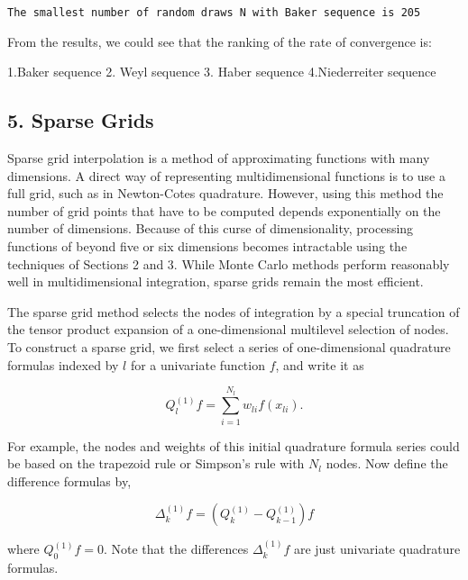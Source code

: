 \documentclass[11pt]{article}
\begin{document}
    \begin{Verbatim}[commandchars=\\\{\}]
The smallest number of random draws N with Baker sequence is 205

    \end{Verbatim}

    From the results, we could see that the ranking of the rate of
convergence is:

1.Baker sequence 2. Weyl sequence 3. Haber sequence 4.Niederreiter
sequence

    \subsection{5. Sparse Grids}\label{sparse-grids}

Sparse grid interpolation is a method of approximating functions with
many dimensions. A direct way of representing multidimensional functions
is to use a full grid, such as in Newton-Cotes quadrature. However,
using this method the number of grid points that have to be computed
depends exponentially on the number of dimensions. Because of this curse
of dimensionality, processing functions of beyond five or six dimensions
becomes intractable using the techniques of Sections 2 and 3. While
Monte Carlo methods perform reasonably well in multidimensional
integration, sparse grids remain the most efficient.

The sparse grid method selects the nodes of integration by a special
truncation of the tensor product expansion of a one-dimensional
multilevel selection of nodes. To construct a sparse grid, we first
select a series of one-dimensional quadrature formulas indexed by \(l\)
for a univariate function \(f\), and write it as

\begin{equation}\label{EqSGQuad}
  Q_l^{(1)}f = \sum_{i=1}^{N_l}w_{li}f(x_{li}).
\end{equation}

For example, the nodes and weights of this initial quadrature formula
series could be based on the trapezoid rule or Simpson's rule with
\(N_l\) nodes. Now define the difference formulas by,

\begin{equation}\label{EqSGDiff}
  \Delta_k^{(1)}f = (Q_k^{(1)}-Q_{k-1}^{(1)})f
\end{equation}

where \(Q_0^{(1)}f=0\). Note that the differences \(\Delta_k^{(1)}f\)
are just univariate quadrature formulas.
\end{document}

